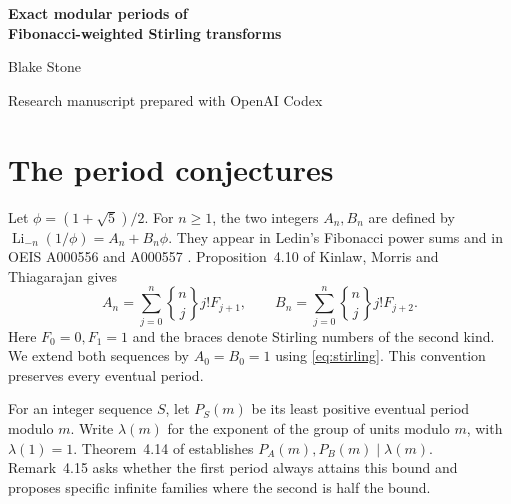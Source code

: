 \documentclass[11pt,letterpaper]{article}
\newcommand{\Li}{\operatorname{Li}}
\newcommand{\stir}[2]{\genfrac{\{}{\}}{0pt}{}{#1}{#2}}
\begin{document}
\thispagestyle{plain}
\begin{center}
{\LARGE\bfseries Exact modular periods of\\[2pt] Fibonacci-weighted Stirling transforms\par}
\vspace{0.6em}
{\large Blake Stone\par}
{\small Research manuscript prepared with OpenAI Codex\par}
\end{center}

\begin{abstract}
Kinlaw, Morris and Thiagarajan conjectured that the least eventual period of
the first of two sequences attached to the golden-ratio polylogarithm equals
Carmichael's function at every modulus. They also conjectured a family of
half-periods for the second sequence. We prove both assertions and classify
the exceptional moduli of the second sequence exactly. Our proof isolates a
nonzero coefficient in the difference between moments separated by $p-1$,
then lifts this obstruction through all odd prime powers. We also determine
the least eventual periods of two central-binomial Stirling transforms at
every modulus.
\end{abstract}

\section{The period conjectures}

Let $\phi=(1+\sqrt5)/2$. For $n\ge1$, the two integers $A_n,B_n$ are defined
by $\Li_{-n}(1/\phi)=A_n+B_n\phi$. They appear in Ledin's Fibonacci power
sums and in OEIS A000556 and A000557 \cite{KMT,OEIS}. Proposition~4.10 of
Kinlaw, Morris and Thiagarajan gives
\begin{equation}\label{eq:stirling}
 A_n=\sum_{j=0}^n \stir nj j!F_{j+1},\qquad
 B_n=\sum_{j=0}^n \stir nj j!F_{j+2}.
\end{equation}
Here $F_0=0,F_1=1$ and the braces denote Stirling numbers of the second kind.
We extend both sequences by $A_0=B_0=1$ using \eqref{eq:stirling}. This
convention preserves every eventual period.

For an integer sequence $S$, let $P_S(m)$ be its least positive eventual
period modulo $m$. Write $\lambda(m)$ for the exponent of the group of units
modulo $m$, with $\lambda(1)=1$. Theorem~4.14 of \cite{KMT} establishes
$P_A(m),P_B(m)\mid\lambda(m)$. Remark~4.15 asks whether the first period
always attains this bound and proposes specific infinite families where the
second is half the bound.
\end{document}
